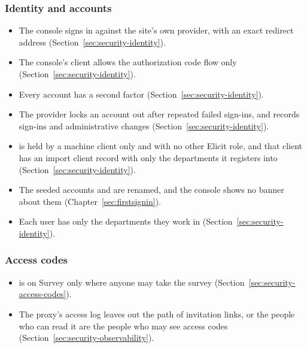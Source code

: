 \documentclass[11pt, a4paper]{article}
\newcommand{\elicitcheck}{\raisebox{-0.12em}{\setlength{\fboxsep}{0pt}\fbox{\rule{0pt}{0.72em}\hspace{0.72em}}}}
\begin{document}
\subsubsection*{Identity and accounts}
\begin{itemize}[label = \elicitcheck]
  \item The console signs in against the site's own provider, with an exact redirect address
        (Section~\ref{sec:security-identity}).
  \item The console's client allows the authorization code flow only
        (Section~\ref{sec:security-identity}).
  \item Every  account has a second factor
        (Section~\ref{sec:security-identity}).
  \item The provider locks an account out after repeated failed sign-ins, and records
        sign-ins and administrative changes (Section~\ref{sec:security-identity}).
  \item {} is held by a machine client only and with no other Elicit
        role, and that client has an import client record with only the departments it
        registers into
        (Section~\ref{sec:security-identity}).
  \item The seeded accounts  and  are renamed, and the console shows no
        banner about them (Chapter~\ref{sec:firstsignin}).
  \item Each user has only the departments they work in
        (Section~\ref{sec:security-identity}).
\end{itemize}

\subsubsection*{Access codes}
\begin{itemize}[label = \elicitcheck]
  \item {} is  on Survey only where anyone may take the
        survey (Section~\ref{sec:security-access-codes}).
  \item The proxy's access log leaves out the path of invitation links, or the people who can
        read it are the people who may see access codes
        (Section~\ref{sec:security-observability}).
\end{itemize}
\end{document}
